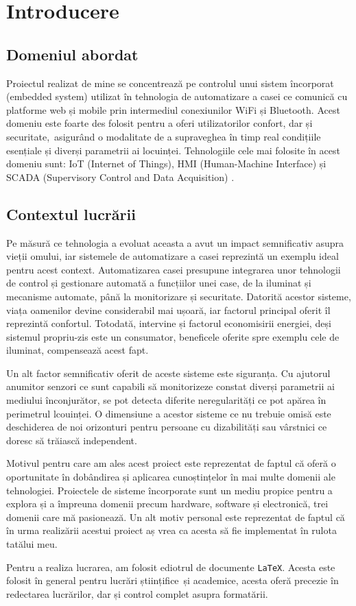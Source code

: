 \chapter{Introducere}\label{section:introduction}
\thispagestyle{pagestyle}

\section{Domeniul abordat}
Proiectul realizat de mine se concentrează pe controlul unui sistem încorporat (embedded system) utilizat în tehnologia de automatizare a casei ce comunică cu platforme web și mobile prin intermediul conexiunilor WiFi și Bluetooth. Acest domeniu este foarte des folosit pentru a oferi utilizatorilor confort, dar și securitate, asigurând o modalitate de a supraveghea în timp real condițiile esențiale și diverși parametrii ai locuinței. Tehnologiile cele mai folosite în acest domeniu sunt: IoT (Internet of Things), HMI (Human-Machine Interface) și SCADA (Supervisory Control and Data Acquisition) \cite{riffat}.

\section{Contextul lucrării}
Pe măsură ce tehnologia a evoluat aceasta a avut un impact semnificativ asupra vieții omului, iar sistemele de automatizare a casei reprezintă un exemplu ideal pentru acest context. Automatizarea casei presupune integrarea unor tehnologii de control și gestionare automată a funcțiilor unei case, de la iluminat și mecanisme automate, până la monitorizare și securitate. Datorită acestor sisteme, viața oamenilor devine considerabil mai ușoară, iar factorul principal oferit îl reprezintă confortul. Totodată, intervine și factorul economisirii energiei, deși sistemul propriu-zis este un consumator, beneficele oferite spre exemplu cele de iluminat, compensează acest fapt.

Un alt factor semnificativ oferit de aceste sisteme este siguranța. Cu ajutorul anumitor senzori ce sunt capabili să monitorizeze constat diverși parametrii ai mediului înconjurător, se pot detecta diferite neregularități ce pot apărea în perimetrul lcouinței. O dimensiune a acestor sisteme ce nu trebuie omisă este deschiderea de noi orizonturi pentru persoane cu dizabilități sau vârstnici ce doresc să trăiască independent.

Motivul pentru care am ales acest proiect este reprezentat de faptul că oferă o oportunitate în dobândirea și aplicarea cunoștințelor în mai multe domenii ale tehnologiei. Proiectele de sisteme încorporate sunt un mediu propice pentru a explora și a împreuna domenii precum hardware, software și electronică, trei domenii care mă pasionează. Un alt motiv personal este reprezentat de faptul că în urma realizării acestui proiect aș vrea ca acesta să fie implementat în rulota tatălui meu.

Pentru a realiza lucrarea, am folosit ediotrul de documente \texttt{LaTeX}. Acesta este folosit în general pentru lucrări științifice și academice, acesta oferă precezie în redectarea lucrărilor, dar și control complet asupra formatării.